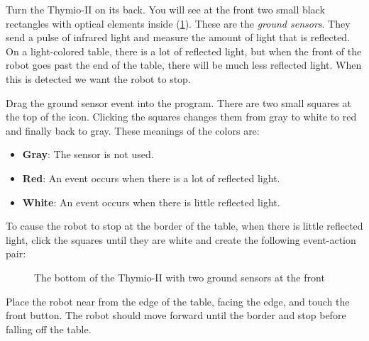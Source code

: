 
Turn the Thymio-II on its back. You will see at the front two small
black rectangles with optical elements inside (\cref{fig.bottom}).
These are the \emph{ground sensors}.
They send a pulse of infrared light and measure the amount of light that is reflected.
On a light-colored table, there is a
lot of reflected light, but when the front of the robot goes past the
end of the table, there will be much less reflected light. When this is
detected we want the robot to stop.


Drag the ground sensor event  into the program. There
are two small squares at the top of the icon. Clicking the squares
changes them from gray to white to red and finally back to gray. These
meanings of the colors are:

\begin{itemize}
\item \textbf{Gray}: The sensor is not used.
\item \textbf{Red}: An event occurs when there is a lot of reflected light.
\item \textbf{White}: An event occurs when there is little reflected light.
\end{itemize}

To cause the robot to stop at the border of the table, when there is little reflected light, click
the squares until they are white and create the following event-action pair:

\begin{figure}
\begin{center}
\caption{The bottom of the Thymio-II with two ground sensors at the
 front}\label{fig.bottom}
\end{center}
\end{figure}

Place the robot near from the edge of the table, facing the edge, and touch the front button.
The robot should move forward until the border and stop before falling off the table.


